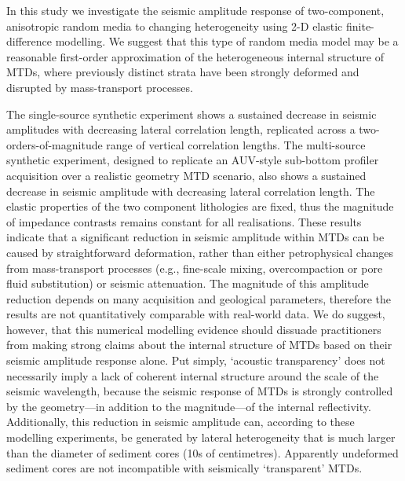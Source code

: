 \documentclass[se,manuscript]{copernicus}
\begin{document}
\conclusions

In this study we investigate the seismic amplitude response of two-component, anisotropic random media to changing heterogeneity using 2-D elastic finite-difference modelling.
We suggest that this type of random media model may be a reasonable first-order approximation of the heterogeneous internal structure of MTDs, where previously distinct strata have been strongly deformed and disrupted by mass-transport processes.

The single-source synthetic experiment shows a sustained decrease in seismic amplitudes with decreasing lateral correlation length, replicated across a two-orders-of-magnitude range of vertical correlation lengths.
The multi-source synthetic experiment, designed to replicate an AUV-style sub-bottom profiler acquisition over a realistic geometry MTD scenario, also shows a sustained decrease in seismic amplitude with decreasing lateral correlation length.
The elastic properties of the two component lithologies are fixed, thus the magnitude of impedance contrasts remains constant for all realisations.
These results indicate that a significant reduction in seismic amplitude within MTDs can be caused by straightforward deformation, rather than either petrophysical changes from mass-transport processes (e.g., fine-scale mixing, overcompaction or pore fluid substitution) or seismic attenuation.
The magnitude of this amplitude reduction depends on many acquisition and geological parameters, therefore the results are not quantitatively comparable with real-world data.
We do suggest, however, that this numerical modelling evidence should dissuade practitioners from making strong claims about the internal structure of MTDs based on their seismic amplitude response alone.
Put simply, `acoustic transparency' does not necessarily imply a lack of coherent internal structure around the scale of the seismic wavelength, because the seismic response of MTDs is strongly controlled by the geometry---in addition to the magnitude---of the internal reflectivity.
Additionally, this reduction in seismic amplitude can, according to these modelling experiments, be generated by lateral heterogeneity that is much larger than the diameter of sediment cores (10s of centimetres).
Apparently undeformed sediment cores are not incompatible with seismically `transparent' MTDs.

\end{document}
